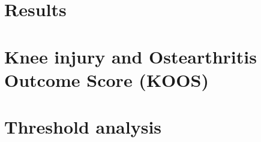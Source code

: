 %

\chapter{Results}



\begingroup
\raggedright



%
%

\endgroup

\appendix

\chapter{\large Knee injury and Ostearthritis Outcome Score (KOOS) \citep{KOOS2016}}\label{app:KOOS}


\chapter{\large Threshold analysis}\label{app:thresholds}



